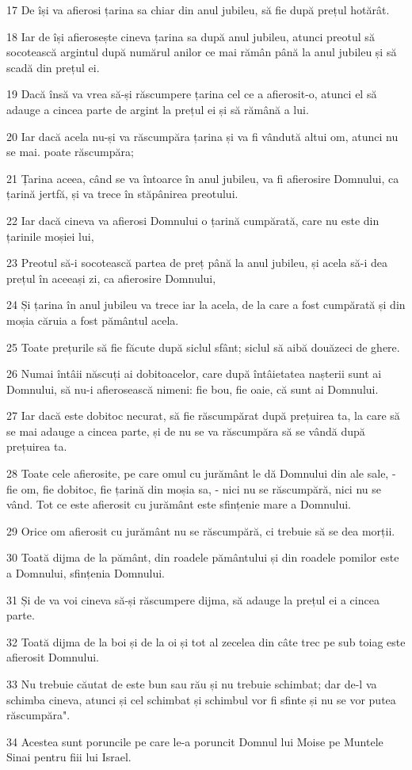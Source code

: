\par 17 De își va afierosi țarina sa chiar din anul jubileu, să fie după prețul hotărât.
\par 18 Iar de își afierosește cineva țarina sa după anul jubileu, atunci preotul să socotească argintul după numărul anilor ce mai rămân până la anul jubileu și să scadă din prețul ei.
\par 19 Dacă însă va vrea să-și răscumpere țarina cel ce a afierosit-o, atunci el să adauge a cincea parte de argint la prețul ei și să rămână a lui.
\par 20 Iar dacă acela nu-și va răscumpăra țarina și va fi vândută altui om, atunci nu se mai. poate răscumpăra;
\par 21 Țarina aceea, când se va întoarce în anul jubileu, va fi afierosire Domnului, ca țarină jertfă, și va trece în stăpânirea preotului.
\par 22 Iar dacă cineva va afierosi Domnului o țarină cumpărată, care nu este din țarinile moșiei lui,
\par 23 Preotul să-i socotească partea de preț până la anul jubileu, și acela să-i dea prețul în aceeași zi, ca afierosire Domnului,
\par 24 Și țarina în anul jubileu va trece iar la acela, de la care a fost cumpărată și din moșia căruia a fost pământul acela.
\par 25 Toate prețurile să fie făcute după siclul sfânt; siclul să aibă douăzeci de ghere.
\par 26 Numai întâii născuți ai dobitoacelor, care după întâietatea nașterii sunt ai Domnului, să nu-i afierosească nimeni: fie bou, fie oaie, că sunt ai Domnului.
\par 27 Iar dacă este dobitoc necurat, să fie răscumpărat după prețuirea ta, la care să se mai adauge a cincea parte, și de nu se va răscumpăra să se vândă după prețuirea ta.
\par 28 Toate cele afierosite, pe care omul cu jurământ le dă Domnului din ale sale, - fie om, fie dobitoc, fie țarină din moșia sa, - nici nu se răscumpără, nici nu se vând. Tot ce este afierosit cu jurământ este sfințenie mare a Domnului.
\par 29 Orice om afierosit cu jurământ nu se răscumpără, ci trebuie să se dea morții.
\par 30 Toată dijma de la pământ, din roadele pământului și din roadele pomilor este a Domnului, sfințenia Domnului.
\par 31 Și de va voi cineva să-și răscumpere dijma, să adauge la prețul ei a cincea parte.
\par 32 Toată dijma de la boi și de la oi și tot al zecelea din câte trec pe sub toiag este afierosit Domnului.
\par 33 Nu trebuie căutat de este bun sau rău și nu trebuie schimbat; dar de-l va schimba cineva, atunci și cel schimbat și schimbul vor fi sfinte și nu se vor putea răscumpăra".
\par 34 Acestea sunt poruncile pe care le-a poruncit Domnul lui Moise pe Muntele Sinai pentru fiii lui Israel.


